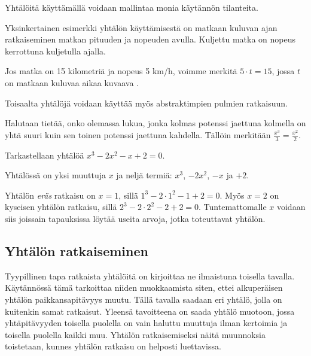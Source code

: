 
Yhtälöitä käyttämällä voidaan mallintaa monia käytännön tilanteita.

\begin{esimerkki}
	Yksinkertainen esimerkki yhtälön käyttämisestä on matkaan kuluvan ajan ratkaiseminen matkan pituuden ja nopeuden avulla. Kuljettu matka on nopeus kerrottuna kuljetulla ajalla. 
	
	Jos matka on 15 kilometriä ja nopeus 5 km/h, voimme merkitä $5\cdot t=15$, jossa $t$ on matkaan kuluvaa aikaa kuvaava .
\end{esimerkki}

Toisaalta yhtälöjä voidaan käyttää myös abstraktimpien pulmien ratkaisuun.

\begin{esimerkki}
	Halutaan tietää, onko olemassa lukua, jonka kolmas potenssi jaettuna kolmella on yhtä suuri kuin sen toinen potenssi jaettuna kahdella. Tällöin merkitään $\frac{x^3}{3}=\frac{x^2}{2}$. 
\end{esimerkki}


\begin{esimerkki}
 Tarkastellaan yhtälöä $x^3-2x^2-x+2=0$. 
 
 Yhtälössä on yksi muuttuja $x$ ja neljä termiä: $x^3$, $-2x^2$, $-x$ ja $+2$.  
 
 Yhtälön \textit{eräs} ratkaisu on $x=1$, sillä $1^3-2\cdot{1^2}-1+2=0$. 
 Myös $x=2$ on kyseisen yhtälön ratkaisu, sillä $2^3-2\cdot{2^2}-2+2=0$. 
 Tuntemattomalle $x$ voidaan siis joissain tapauksissa löytää useita arvoja, jotka toteuttavat yhtälön. 
\end{esimerkki}

\subsection*{Yhtälön ratkaiseminen}

Tyypillinen tapa ratkaista yhtälöitä on kirjoittaa ne ilmaistuna toisella tavalla. Käytännössä tämä tarkoittaa niiden muokkaamista siten, ettei alkuperäisen yhtälön paikkansapitävyys muutu. Tällä tavalla saadaan eri yhtälö, jolla on kuitenkin samat ratkaisut. Yleensä tavoitteena on saada yhtälö muotoon, jossa yhtäpitävyyden toisella puolella on vain haluttu muuttuja ilman kertoimia ja toisella puolella kaikki muu.  Yhtälön ratkaisemiseksi näitä muunnoksia toistetaan, kunnes yhtälön ratkaisu on helposti luettavissa.

